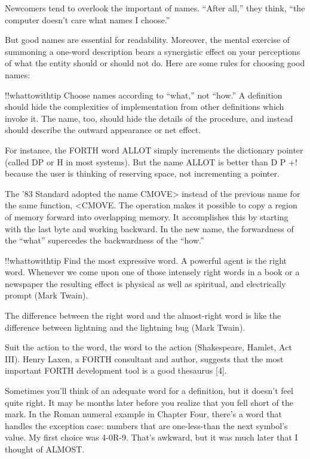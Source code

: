 Newcomers tend to overlook the important of names.  ``After all,''
they think, ``the computer doesn't care what names I choose.''

But good names are essential for readability.  Moreover, the mental
exercise of summoning a one-word description bears a synergistic effect
on your perceptions of what the entity should or should not do.
Here are some rules for choosing good names:

!!whattowithtip{
Choose names according to ``what,'' not ``how.''
}
A definition should hide the complexities of implementation from other
definitions which invoke it.  The name, too, should hide the details of the
procedure, and instead should describe the outward appearance or net
effect.

For instance, the FORTH word ALLOT simply increments the dictionary
pointer (called DP or H in most systems).  But the name ALLOT
is better than D P +! because the user is thinking of reserving space, not
incrementing a pointer.

The '83 Standard adopted the name CMOVE> instead of the previous
name for the same function, <CMOVE.  The operation makes it
possible to copy a region of memory forward into overlapping memory.  It
accomplishes this by starting with the last byte and working backward.
In the new name, the forwardness of the ``what'' supercedes the
backwardness of the ``how.''

!!whattowithtip{
Find the most expressive word.
}
A powerful agent is the right word.  Whenever we come upon one of those intensely
right words in a book or a newspaper the resulting effect is physical
as well as spiritual, and electrically prompt (Mark Twain).

The difference between the right word and the almost-right word is like the
difference between lightning and the lightning bug (Mark Twain).

Suit the action to the word, the word to the action (Shakespeare, Hamlet,
Act III).
Henry Laxen, a FORTH consultant and author, suggests that the most
important FORTH development tool is a good thesaurus [4].

Sometimes you'll think of an adequate word for a definition, but it
doesn't feel quite right.  It may be months later before you realize that
you fell short of the mark.  In the Roman numeral example in Chapter
Four, there's a word that handles the exception case: numbers that are
one-less-than the next symbol's value.  My first choice was 4-0R-9.  That's
awkward, but it was much later that I thought of ALMOST.

